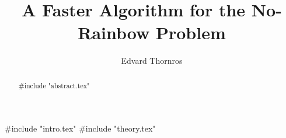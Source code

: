 \documentclass{report}
\title{A Faster Algorithm for the No-Rainbow Problem}
\author{Edvard Thornros}
\begin{document}
\maketitle

\begin{abstract}

#include "abstract.tex"

\end{abstract}

#include "intro.tex"
#include "theory.tex"

\printbibliography
\end{document}
